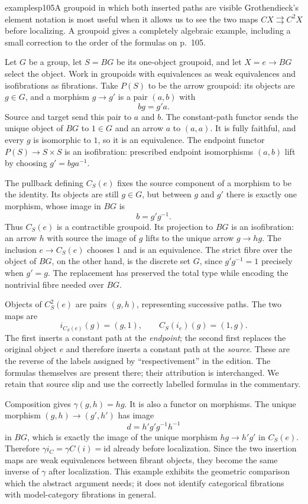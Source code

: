 \begin{dcomment}{examples}{p105}{A groupoid in which both inserted paths are visible}
Grothendieck's element notation is most useful when it allows us to see the two maps $CX\rightrightarrows C^2X$ before localizing. A groupoid gives a completely algebraic example, including a small correction to the order of the formulas on p.~105.

Let $G$ be a group, let $S=BG$ be its one-object groupoid, and let $X=e\to BG$ select the object. Work in groupoids with equivalences as weak equivalences and isofibrations as fibrations. Take $P(S)$ to be the arrow groupoid: its objects are $g\in G$, and a morphism $g\to g'$ is a pair $(a,b)$ with
\[
 bg=g'a.
\]
Source and target send this pair to $a$ and $b$. The constant-path functor sends the unique object of $BG$ to $1\in G$ and an arrow $a$ to $(a,a)$. It is fully faithful, and every $g$ is isomorphic to $1$, so it is an equivalence. The endpoint functor $P(S)\to S\times S$ is an isofibration: prescribed endpoint isomorphisms $(a,b)$ lift by choosing $g'=bga^{-1}$.

The pullback defining $C_S(e)$ fixes the source component of a morphism to be the identity. Its objects are still $g\in G$, but between $g$ and $g'$ there is exactly one morphism, whose image in $BG$ is
\[
 b=g'g^{-1}.
\]
Thus $C_S(e)$ is a contractible groupoid. Its projection to $BG$ is an isofibration: an arrow $h$ with source the image of $g$ lifts to the unique arrow $g\to hg$. The inclusion $e\to C_S(e)$ chooses $1$ and is an equivalence. The strict fibre over the object of $BG$, on the other hand, is the discrete set $G$, since $g'g^{-1}=1$ precisely when $g'=g$. The replacement has preserved the total type while encoding the nontrivial fibre needed over $BG$.

Objects of $C_S^2(e)$ are pairs $(g,h)$, representing successive paths. The two maps are
\[
 i_{C_S(e)}(g)=(g,1),\qquad
 C_S(i_e)(g)=(1,g).
\]
The first inserts a constant path at the \emph{endpoint}; the second first replaces the original object $e$ and therefore inserts a constant path at the \emph{source}. These are the reverse of the labels assigned by ``respectivement'' in the edition. The formulas themselves are present there; their attribution is interchanged. We retain that source slip and use the correctly labelled formulas in the commentary.

Composition gives $\gamma(g,h)=hg$. It is also a functor on morphisms. The unique morphism $(g,h)\to(g',h')$ has image
\[
 d=h'g'g^{-1}h^{-1}
\]
in $BG$, which is exactly the image of the unique morphism $hg\to h'g'$ in $C_S(e)$. Therefore $\gamma i_C=\gamma C(i)=\mathrm{id}$ already before localization. Since the two insertion maps are weak equivalences between fibrant objects, they become the same inverse of $\gamma$ after localization. This example exhibits the geometric comparison which the abstract argument needs; it does not identify categorical fibrations with model-category fibrations in general.


\end{dcomment}
